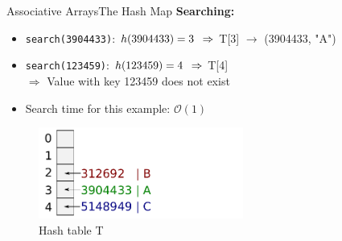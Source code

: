 
\begin{frame}{Associative Arrays}{The Hash Map}
  \textbf{Searching:}
  \small
  \begin{itemize}
     \setlength\itemsep{0.75em}
    \item<1->
      \texttt{search(3904433)}:
      $h(3904433) = 3 \hspace*{0.5em} \Rightarrow$
      T[3] $\rightarrow$ {\color{inkscapeGreen}(3904433, "A")}
    \item<2->
      \texttt{search(123459)}:
      $h(123459) = 4 \hspace*{0.5em} \Rightarrow$
      T[4] {}\\
      \vspace{0.75em}
      $\Rightarrow$ {\color{red}Value with key 123459 does not exist}
    \item<3->
      Search time for this example: {\color{MainA}$\mathcal{O}(1)$}
  \end{itemize}
  \vspace*{-1.0em}
  \begin{figure}
    \caption{Hash table T}
    \centering
    \includegraphics[width=0.6\textwidth]{Images/Bucket4.pdf}
  \end{figure}
\end{frame}


